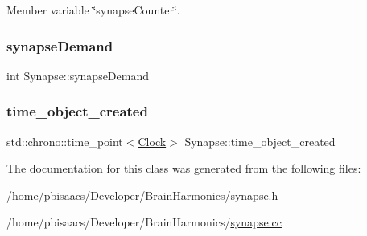 Member variable \char`\"{}synapse\+Counter\char`\"{}. 

\mbox{\label{classSynapse_a9395cb1a49c5b736647b17dcfa23895d}} 
\subsubsection{\texorpdfstring{synapse\+Demand}{synapseDemand}}
{\footnotesize\ttfamily int Synapse\+::synapse\+Demand\hspace{0.3cm}{\ttfamily [private]}}

\mbox{\label{classSynapse_afbfdba5e6a7bfaf688189d07a9dd62a0}} 
\subsubsection{\texorpdfstring{time\+\_\+object\+\_\+created}{time\_object\_created}}
{\footnotesize\ttfamily std\+::chrono\+::time\+\_\+point$<$\mbox{\hyperlink{universe_8h_a0ef8d951d1ca5ab3cfaf7ab4c7a6fd80}{Clock}}$>$ Synapse\+::time\+\_\+object\+\_\+created\hspace{0.3cm}{\ttfamily [private]}}



The documentation for this class was generated from the following files\+:\begin{DoxyCompactItemize}
\item 
/home/pbisaacs/\+Developer/\+Brain\+Harmonics/\mbox{\hyperlink{synapse_8h}{synapse.\+h}}\item 
/home/pbisaacs/\+Developer/\+Brain\+Harmonics/\mbox{\hyperlink{synapse_8cc}{synapse.\+cc}}\end{DoxyCompactItemize}
